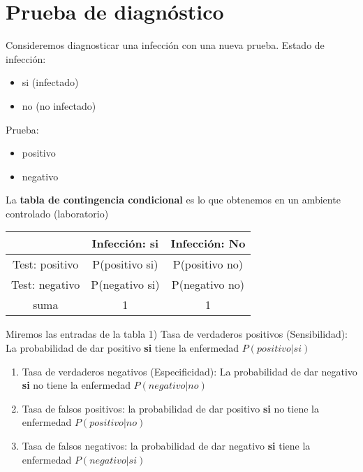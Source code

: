 \documentclass[
]{book}
\providecommand{\tightlist}{%
  \setlength{\itemsep}{0pt}\setlength{\parskip}{0pt}}
\begin{document}
\hypertarget{prueba-de-diagnuxf3stico}{%
\section{Prueba de diagnóstico}\label{prueba-de-diagnuxf3stico}}

Consideremos diagnosticar una infección con una nueva prueba. Estado de infección:

\begin{itemize}
\tightlist
\item
  si (infectado)
\item
  no (no infectado)
\end{itemize}

Prueba:

\begin{itemize}
\tightlist
\item
  positivo
\item
  negativo
\end{itemize}

La \textbf{tabla de contingencia condicional} es lo que obtenemos en un ambiente controlado (laboratorio)

\begin{longtable}[]{@{}ccc@{}}
\toprule
& Infección: si & Infección: No \\
\midrule
\endhead
Test: positivo & P(positivo {\textbar{}} si) & P(positivo {\textbar{}} no) \\
Test: negativo & P(negativo {\textbar{}} si) & P(negativo {\textbar{}} no) \\
suma & 1 & 1 \\
\bottomrule
\end{longtable}

Miremos las entradas de la tabla
1) Tasa de verdaderos positivos (Sensibilidad): La probabilidad de dar positivo \textbf{si} tiene la enfermedad \(P(positivo|si)\)

\begin{enumerate}
\def\labelenumi{\arabic{enumi})}
\setcounter{enumi}{1}
\item
  Tasa de verdaderos negativos (Especificidad): La probabilidad de dar negativo \textbf{si} no tiene la enfermedad \(P(negativo|no)\)
\item
  Tasa de falsos positivos: la probabilidad de dar positivo \textbf{si} no tiene la enfermedad \(P(positivo|no)\)
\item
  Tasa de falsos negativos: la probabilidad de dar negativo \textbf{si} tiene la enfermedad \(P(negativo|si)\)
\end{enumerate}
\end{document}
